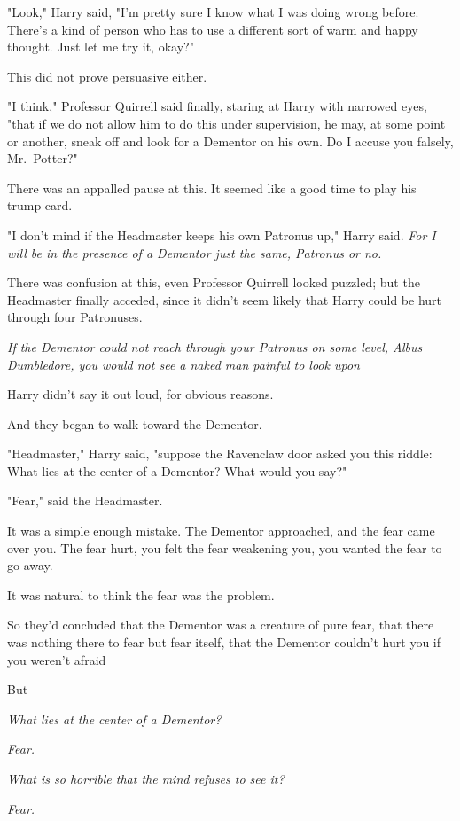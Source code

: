"Look," Harry said, "I'm pretty sure I know what I was doing wrong before.
There's a kind of person who has to use a different sort of warm and happy
thought. Just let me try it, okay?"

This did not prove persuasive either.

"I think," Professor Quirrell said finally, staring at Harry with narrowed
eyes, "that if we do not allow him to do this under supervision, he may, at
some point or another, sneak off and look for a Dementor on his own. Do I
accuse you falsely, Mr.~Potter?"

There was an appalled pause at this. It seemed like a good time to play his
trump card.

"I don't mind if the Headmaster keeps his own Patronus up," Harry said.
\emph{For I will be in the presence of a Dementor just the same, Patronus or
no.}

There was confusion at this, even Professor Quirrell looked puzzled; but the
Headmaster finally acceded, since it didn't seem likely that Harry could be
hurt through four Patronuses.

\emph{If the Dementor could not reach through your Patronus on some level,
Albus Dumbledore, you would not see a naked man painful to look upon{\el}}

Harry didn't say it out loud, for obvious reasons.

And they began to walk toward the Dementor.

"Headmaster," Harry said, "suppose the Ravenclaw door asked you this riddle:
What lies at the center of a Dementor? What would you say?"

"Fear," said the Headmaster.

It was a simple enough mistake. The Dementor approached, and the fear came over
you. The fear hurt, you felt the fear weakening you, you wanted the fear to go
away.

It was natural to think the fear was the problem.

So they'd concluded that the Dementor was a creature of pure fear, that there
was nothing there to fear but fear itself, that the Dementor couldn't hurt you
if you weren't afraid{\el}

But{\el}

\emph{What lies at the center of a Dementor?}

\emph{Fear.}

\emph{What is so horrible that the mind refuses to see it?}

\emph{Fear.}

